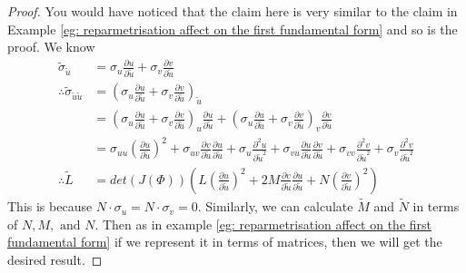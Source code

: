 \documentclass{article}
\theoremstyle{plain}
\theoremstyle{definition}
\theoremstyle{remark}
\begin{document}
\begin{proof}[Proof]
    You would have noticed that the claim here is very similar to the claim in Example \ref{eg: reparmetrisation affect on the first fundamental form} and so is the proof.
    We know
    \begin{align*}
        \tilde{\sigma}_{\tilde{u}}                       & = \sigma_u \frac{\partial u}{\partial \tilde{u}}  + \sigma_v \frac{\partial v}{\partial \tilde{u}}                                                                                                                                                                                                                                                                                                                         \\
        \therefore  \tilde{\sigma}_{\tilde{u} \tilde{u}} & = (\sigma_u \frac{\partial u}{\partial \tilde{u}}  + \sigma_v \frac{\partial v}{\partial \tilde{u}})_{\tilde{u}}                                                                                                                                                                                                                                                                                                           \\
                                                         & = (\sigma_u \frac{\partial u}{\partial \tilde{u}}  + \sigma_v \frac{\partial v}{\partial \tilde{u}})_u \frac{\partial u}{\partial \tilde{u}} +  (\sigma_u \frac{\partial u}{\partial \tilde{u}}  + \sigma_v \frac{\partial v}{\partial \tilde{u}})_v \frac{\partial v}{\partial \tilde{u}}                                                                                                                                 \\
                                                         & = \sigma_{uu} \left(\frac{\partial u}{\partial \tilde{u}} \right)^2 +  \sigma_{uv} \frac{\partial v}{\partial \tilde{u}} \frac{\partial u}{\partial \tilde{u}} + \sigma_u \frac{\partial^2 u}{\partial \tilde{u}^2} + \sigma_{vu} \frac{\partial u}{\partial \tilde{u}}\frac{\partial v}{\partial \tilde{u}} + \sigma_{vv}\frac{\partial^2 v}{\partial \tilde{u}^2} + \sigma_{v} \frac{\partial^2 v}{\partial \tilde{u}^2} \\
        \therefore \tilde{L}                             & = det(J(\Phi))\left( L \left(\frac{\partial u}{\partial \tilde{u}} \right)^2 + 2M \frac{\partial v}{\partial \tilde{u}} \frac{\partial u}{\partial \tilde{u}} + N \left(\frac{\partial v}{\partial \tilde{u}} \right)^2 \right)
    \end{align*}
    This is because \( N\cdot\sigma_u = N\cdot\sigma_v = 0\). Similarly, we can calculate \(\tilde{M} \) and \(\tilde{N}\) in terms of \(N, M, \text{ and } N\). Then as in example \ref{eg: reparmetrisation affect on the first fundamental form} if we represent it in terms of matrices, then we will get the desired result.
\end{proof}
\end{document}
